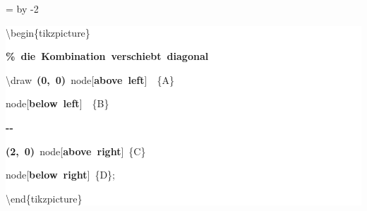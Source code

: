 \begingroup
\ttfamily
{}
=\textwidth
\advance{} by -2\fboxsep
\noindent
\colorbox{background}
{%
\parbox{\dimen255}
{%
\rule[-0.5ex]{0pt}{2.5ex}\hspace*{0.0em}\textbackslash{}begin\{tikzpicture\}\\
\rule[-0.5ex]{0pt}{2.5ex}\hspace*{1.0em}\textcolor{G}{\textbf{\%~die~Kombination~verschiebt~diagonal}}\\
\rule[-0.5ex]{0pt}{2.5ex}\hspace*{1.0em}\textbackslash{}draw~\textcolor{B}{\textbf{(0,~0)}}~node[\textcolor{R}{\textbf{above~left}}]~~\{A\}\\
\rule[-0.5ex]{0pt}{2.5ex}\hspace*{7.5em}node[\textcolor{R}{\textbf{below~left}}]~~\{B\}\\
\rule[-0.5ex]{0pt}{2.5ex}\hspace*{4.0em}\textcolor{B}{\textbf{{-}{-}}}\\
\rule[-0.5ex]{0pt}{2.5ex}\hspace*{4.0em}\textcolor{B}{\textbf{(2,~0)}}~node[\textcolor{R}{\textbf{above~right}}]~\{C\}\\
\rule[-0.5ex]{0pt}{2.5ex}\hspace*{7.5em}node[\textcolor{R}{\textbf{below~right}}]~\{D\};\\
\rule[-0.5ex]{0pt}{2.5ex}\hspace*{0.0em}\textbackslash{}end\{tikzpicture\}}%
}%
\endgroup
